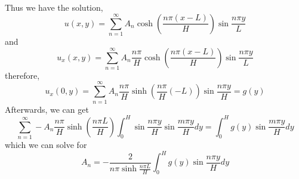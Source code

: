 \documentclass[11pt]{article}
\theoremstyle{mystyle}
\theoremstyle{definition}
\begin{document}
Thus we have the solution, 
\[
  u(x,y) = \sum_{n=1}^\infty A_n \cosh \left( \displaystyle\frac{n\pi (x-L)}{H} \right) \sin \displaystyle\frac{n\pi y}{L} 
\]
and 
\[
  u_x(x,y) = \sum_{n=1}^\infty A_n \displaystyle\frac{n\pi}{H}\cosh \left( \displaystyle\frac{n\pi (x-L)}{H} \right) \sin \displaystyle\frac{n\pi y}{L} 
\]
therefore, 
\[
  u_x(0,y) = \sum_{n=1}^\infty A_n \displaystyle\frac{n\pi}{H} \sinh \left(\displaystyle\frac{n\pi}{H} (-L) \right)\sin \displaystyle\frac{n\pi y}{H} = g(y)
\]
Afterwards, we can get 
\[ 
  \sum_{n=1}^\infty -A_n \displaystyle\frac{n\pi}{H} \sinh \left(\displaystyle\frac{n\pi L}{H} \right) \int_0^H \sin \displaystyle\frac{n\pi y}{H} \sin \displaystyle\frac{m\pi y}{H} dy= \int_0^H g(y) \sin \displaystyle\frac{m\pi y}{H} dy 
\]
which we can solve for 
\[
  A_n = -\displaystyle\frac{2}{n\pi \sinh \displaystyle\frac{n\pi L}{H}} \int_0^H g(y) \sin \displaystyle\frac{n\pi y}{H} dy
\]
\newpage
\end{document}
